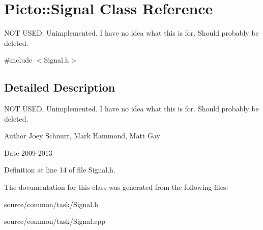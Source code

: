 \hypertarget{class_picto_1_1_signal}{\section{Picto\-:\-:Signal Class Reference}
\label{class_picto_1_1_signal}
}


N\-O\-T U\-S\-E\-D. Unimplemented. I have no idea what this is for. Should probably be deleted.  




{\ttfamily \#include $<$Signal.\-h$>$}



\subsection{Detailed Description}
N\-O\-T U\-S\-E\-D. Unimplemented. I have no idea what this is for. Should probably be deleted. 

\begin{DoxyAuthor}{Author}
Joey Schnurr, Mark Hammond, Matt Gay 
\end{DoxyAuthor}
\begin{DoxyDate}{Date}
2009-\/2013 
\end{DoxyDate}


Definition at line 14 of file Signal.\-h.



The documentation for this class was generated from the following files\-:\begin{DoxyCompactItemize}
\item 
source/common/task/Signal.\-h\item 
source/common/task/Signal.\-cpp\end{DoxyCompactItemize}
